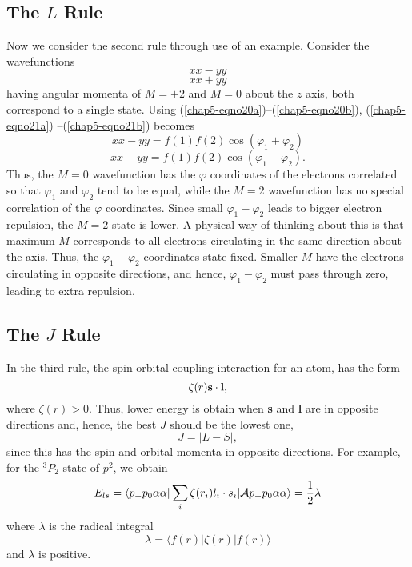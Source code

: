 \subsection{The $L$ Rule}

Now we consider the second rule through use of an example.  Consider the
wavefunctions
\begin{equation}
xx - yy
\label{chap5-eqno21a}
\end{equation}
\begin{equation}
xx + yy
\label{chap5-eqno21b}
\end{equation}
having angular momenta of $M = +2$ and $M = 0$ about the $z$ axis,
both correspond to a single state.  Using
(\ref{chap5-eqno20a})--(\ref{chap5-eqno20b}), (\ref{chap5-eqno21a})
--(\ref{chap5-eqno21b}) becomes
\begin{equation}
xx - yy = f (1) f(2) \cos ( \varphi_1 + \varphi_2 )
\end{equation}
\begin{equation}
xx + yy = f (1) f(2) \cos ( \varphi_1 - \varphi_2 ).
\end{equation}
Thus, the $M = 0$ wavefunction has the $\varphi$ coordinates of the 
electrons correlated so that $\varphi_1$ and $\varphi_2$ tend to be 
equal, while the $M = 2$ wavefunction has no special correlation of 
the $\varphi$ coordinates.  Since small $\varphi_1 - \varphi_2$ leads 
to bigger electron repulsion, the $M = 2$ state is lower.  A physical 
way of thinking about this is that maximum $M$ corresponds to all 
electrons circulating in the same direction about the axis.  Thus, 
the $\varphi_1 - \varphi_2$ coordinates state fixed.  Smaller $M$ 
have the electrons circulating in opposite directions, and hence, 
$\varphi_1 - \varphi_2$ must pass through zero, leading to extra 
repulsion.

\subsection{The $J$ Rule}

In the third rule, the spin orbital coupling interaction for an atom, 
has the form
\begin{equation}
\zeta ( r ) {\bf s} \cdot {\bf l} ,
\end{equation}
where $\zeta (r) > 0$.  Thus, lower energy is obtain when {\bf s} 
and {\bf l} are in opposite directions and, hence, the best $J$ should 
be the lowest one, 
\begin{equation}
J = | L - S|,
\end{equation}
since this has the spin and orbital momenta in opposite directions.
For example, for the ${^3P}_2$ state of $p^2$, we obtain
\begin{equation}
E_{ls} = \langle p_+ p_0 \alpha \alpha | \sum_{i} \zeta ( r_i ) l_i 
\cdot s_i | {\cal A} p_+ p_0 \alpha \alpha \rangle = {1 \over 2} 
\lambda
\label{chap5-eqno22}
\end{equation}
where $\lambda$ is the radical integral
\begin{equation}
\lambda = \langle f ( r ) | \zeta ( r ) | f ( r ) \rangle
\end{equation}
and $\lambda$ is positive.

